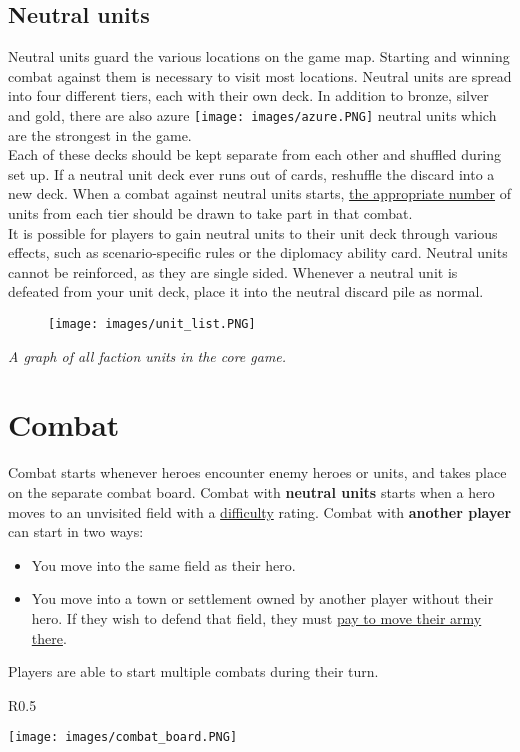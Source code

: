 \documentclass[12pt]{article}
\begin{document}
\subsection*{Neutral units}
Neutral units guard the various locations on the game map. Starting and winning combat against them is necessary to visit most locations. Neutral units are spread into four different tiers, each with their own deck. In addition to bronze, silver and gold, there are also azure \texttt{[image: images/azure.PNG]} neutral units which are the strongest in the game.\\[6pt]
Each of these decks should be kept separate from each other and shuffled during set up. If a neutral unit deck ever runs out of cards, reshuffle the discard into a new deck. When a combat against neutral units starts, \hyperlink{Difficulty}{the appropriate number} of units from each tier should be drawn to take part in that combat.\\[6pt]
It is possible for players to gain neutral units to their unit deck through various effects, such as scenario-specific rules or the diplomacy ability card. Neutral units cannot be reinforced, as they are single sided. Whenever a neutral unit is defeated from your unit deck, place it into the neutral discard pile as normal.
\begin{figure}[h]
\centering
\texttt{[image: images/unit\_list.PNG]}
\end{figure}
\begin{center}
\textit{A graph of all faction units in the core game.}
\end{center}

\clearpage
\section[Combat]{Combat\hypertarget{Combat}{}}
Combat starts whenever heroes encounter enemy heroes or units, and takes place on the separate combat board. Combat with \textbf{neutral units} starts when a hero moves to an unvisited field with a \hyperlink{Difficulty}{difficulty} rating. Combat with \textbf{another player} can start in two ways:
\begin{itemize}
    \item You move into the same field as their hero.
    \item You move into a town or settlement owned by another player without their hero. If they wish to defend that field, they must \hyperlink{Town}{pay to move their army there}.
\end{itemize}
Players are able to start multiple combats during their turn.
\begin{wrapfigure}{R}{0.5\textwidth}
    \begin{center}
    \texttt{[image: images/combat\_board.PNG]}
    \end{center}
\end{wrapfigure}
\end{document}
